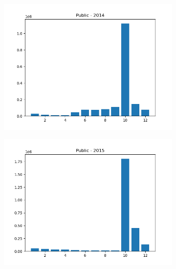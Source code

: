 \documentclass{article}
\begin{document}
\begin{figure}[H]
\begin{subfigure}{.5\textwidth}
    \end{subfigure}
    \begin{subfigure}{.5\textwidth}
        \centering
        \includegraphics[width=\textwidth]{../../output/figures/annual_source_distribution/Public_data_dist_2014.png}
    \end{subfigure}
    \begin{subfigure}{.5\textwidth}
        \centering
        \includegraphics[width=\textwidth]{../../output/figures/annual_source_distribution/Public_data_dist_2015.png}
    \end{subfigure}
    \begin{subfigure}{.5\textwidth}
        \centering

\end{subfigure}
\end{figure}
\end{document}
